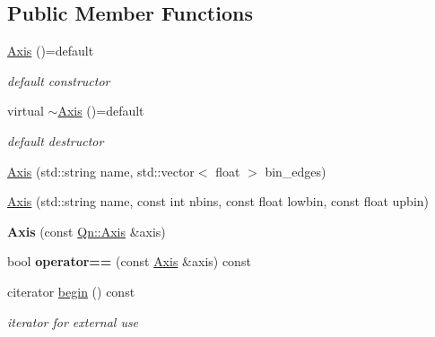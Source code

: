 \subsection*{Public Member Functions}
\begin{DoxyCompactItemize}
\item 
\mbox{\label{classQn_1_1Axis_afda68534099c45ff3e4105a9dd5d6f15}} 
\mbox{\hyperlink{classQn_1_1Axis_afda68534099c45ff3e4105a9dd5d6f15}{Axis}} ()=default
\begin{DoxyCompactList}\small\item\em default constructor \end{DoxyCompactList}\item 
\mbox{\label{classQn_1_1Axis_a681cf1e062f2256bcdaea4c990b87e79}} 
virtual \mbox{\hyperlink{classQn_1_1Axis_a681cf1e062f2256bcdaea4c990b87e79}{$\sim$\+Axis}} ()=default
\begin{DoxyCompactList}\small\item\em default destructor \end{DoxyCompactList}\item 
\mbox{\hyperlink{classQn_1_1Axis_aecffcf8ea49a172d67e5a620082f3914}{Axis}} (std\+::string name, std\+::vector$<$ float $>$ bin\+\_\+edges)
\item 
\mbox{\hyperlink{classQn_1_1Axis_aba5f6d07ac72fc4eda097edd15336c86}{Axis}} (std\+::string name, const int nbins, const float lowbin, const float upbin)
\item 
\mbox{\label{classQn_1_1Axis_a5a1bb456f84f482991c75154ca8dbe2c}} 
{\bfseries Axis} (const \mbox{\hyperlink{classQn_1_1Axis}{Qn\+::\+Axis}} \&axis)
\item 
\mbox{\label{classQn_1_1Axis_acf2d80052d44ddb91ac2223747ebd8ab}} 
bool {\bfseries operator==} (const \mbox{\hyperlink{classQn_1_1Axis}{Axis}} \&axis) const
\item 
\mbox{\label{classQn_1_1Axis_a1b3db6cf7a0918edc640a8a38556a04a}} 
citerator \mbox{\hyperlink{classQn_1_1Axis_a1b3db6cf7a0918edc640a8a38556a04a}{begin}} () const
\begin{DoxyCompactList}\small\item\em iterator for external use \end{DoxyCompactList}\item 

\end{DoxyCompactItemize}
